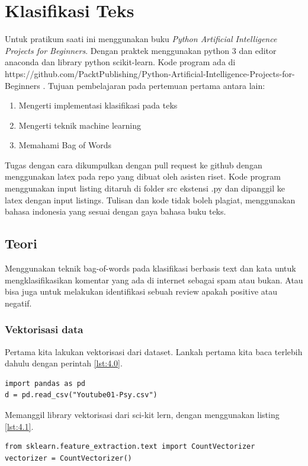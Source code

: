 \chapter{Klasifikasi Teks}

Untuk pratikum saati ini menggunakan buku \textit{Python Artificial Intelligence Projects for Beginners}\cite{eckroth2018python}. Dengan praktek menggunakan python 3 dan editor anaconda dan library python scikit-learn.
Kode program ada di https://github.com/PacktPublishing/Python-Artificial-Intelligence-Projects-for-Beginners .
Tujuan pembelajaran pada pertemuan pertama antara lain:
\begin{enumerate}
	\item
	      Mengerti implementasi klasifikasi pada teks
	\item
	      Mengerti teknik machine learning
	\item
	      Memahami Bag of Words
\end{enumerate}

Tugas dengan cara dikumpulkan dengan pull request ke github dengan menggunakan latex pada repo yang dibuat oleh asisten riset. Kode program menggunakan input listing ditaruh di folder src ekstensi .py dan dipanggil ke latex dengan input listings. Tulisan dan kode tidak boleh plagiat, menggunakan bahasa indonesia yang sesuai dengan gaya bahasa buku teks.

\section{Teori}
Menggunakan teknik bag-of-words pada klasifikasi berbasis text dan kata untuk mengklasifikasikan komentar yang ada di internet sebagai spam atau bukan. Atau bisa juga untuk melakukan identifikasi sebuah review apakah positive atau negatif.


\subsection{Vektorisasi data}
Pertama kita lakukan vektorisasi dari dataset. Lankah pertama kita baca terlebih dahulu dengan perintah \ref{lst:4.0}.
\begin{lstlisting}[caption=Membaca data file txt,label={lst:4.0}]
import pandas as pd
d = pd.read_csv("Youtube01-Psy.csv")
\end{lstlisting}

Memanggil library vektorisasi dari sci-kit lern, dengan menggunakan listing \ref{lst:4.1}.

\begin{lstlisting}[caption=Instansiasi Vektorizer,label={lst:4.1}]
from sklearn.feature_extraction.text import CountVectorizer
vectorizer = CountVectorizer()
\end{lstlisting}

